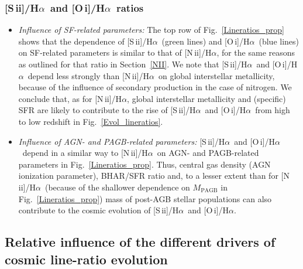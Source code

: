 \documentclass[fleqn,usenatbib]{mnras}
\newcommand{\niiha}{\hbox{[N\,{\sc ii}]/H$\alpha$}}
\newcommand{\siiha}{\hbox{[S\,{\sc ii}]/H$\alpha$}}
\newcommand{\oiha}{\hbox{[O\,{\sc i}]/H$\alpha$}}
\begin{document}
\subsubsection{\siiha\ and \oiha\ ratios}\label{SII} 

\begin{itemize}

\item{\it Influence of SF-related parameters:}
%
The top row of Fig.~\ref{Lineratios_prop} shows that the dependence of
\siiha\ (green lines) and \oiha\ (blue lines) on SF-related parameters
is similar to that of \niiha, for the same reasons as outlined for
that ratio in Section~\ref{NII}.   We note that \siiha\ and  \oiha\
depend less strongly than \niiha\ on global interstellar  metallicity,
because of the influence of secondary production in the case of
nitrogen. We conclude that, as for \niiha, global interstellar
metallicity and (specific) SFR are likely to contribute to the rise of
\siiha\ and \oiha\ from high to low redshift in
Fig.~\ref{Evol_lineratios}.  
 
\item{\it Influence of AGN- and PAGB-related parameters:} 
%
\siiha\ and \oiha\ depend in a similar way to \niiha\ on AGN-
and PAGB-related parameters in Fig.~\ref{Lineratios_prop}. Thus,
central  gas density (AGN ionization parameter), BHAR/SFR ratio
and, to a lesser extent than for \niiha\ (because of the shallower
dependence on  $M_\mathrm{PAGB}$ in Fig.~\ref{Lineratios_prop}) mass
of post-AGB stellar populations can also contribute to the cosmic
evolution of \siiha\ and \oiha.  

\end{itemize}

\subsection{Relative influence of the different drivers of cosmic line-ratio evolution}\label{relimpact}
\end{document}

